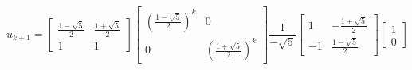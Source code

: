 \documentclass[preview]{standalone}
\begin{document}
\begin{center}
$$u_{k + 1} = \begin{bmatrix} \frac{1 - \sqrt{5}}{2} & \frac{1 + \sqrt{5}}{2} \\ 1 & 1 \end{bmatrix} \begin{bmatrix} (\frac{1 - \sqrt{5}}{2})^k &  0 \\ 0 & (\frac{1 + \sqrt{5}}{2})^k \end{bmatrix} \frac{1}{-\sqrt{5}}\begin{bmatrix} 1 & - \frac{1 + \sqrt{5}}{2} \\ -1 & \frac{1 - \sqrt{5}}{2} \end{bmatrix} \begin{bmatrix} 1 \\ 0 \end{bmatrix}$$
\end{center}
\end{document}

